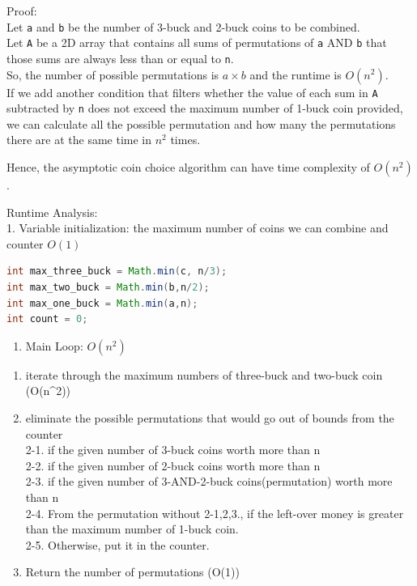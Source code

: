 \documentclass[
]{article}
\newcommand{\passthrough}[1]{#1}
\providecommand{\tightlist}{%
  \setlength{\itemsep}{0pt}\setlength{\parskip}{0pt}}
\begin{document}
Proof:\\
Let \passthrough{\lstinline!a!} and \passthrough{\lstinline!b!} be the
number of 3-buck and 2-buck coins to be combined.\\
Let \passthrough{\lstinline!A!} be a 2D array that contains all sums of
permutations of \passthrough{\lstinline!a!} AND
\passthrough{\lstinline!b!} that those sums are always less than or
equal to \passthrough{\lstinline!n!}.\\
So, the number of possible permutations is \(a \times b\) and the
runtime is \(O(n^2)\).\\
If we add another condition that filters whether the value of each sum
in \passthrough{\lstinline!A!} subtracted by \passthrough{\lstinline!n!}
does not exceed the maximum number of 1-buck coin provided, we can
calculate all the possible permutation and how many the permutations
there are at the same time in \(n^2\) times.

Hence, the asymptotic coin choice algorithm can have time complexity of
\(O(n^2)\).

Runtime Analysis:\\
1. Variable initialization: the maximum number of coins we can combine
and counter \(O(1)\)

\begin{lstlisting}[language=Java]
int max_three_buck = Math.min(c, n/3);
int max_two_buck = Math.min(b,n/2);
int max_one_buck = Math.min(a,n);
int count = 0;
\end{lstlisting}

\begin{enumerate}
\def\labelenumi{\arabic{enumi}.}
\setcounter{enumi}{1}
\tightlist
\item
  Main Loop: \(O(n^2)\)
\end{enumerate}

\begin{enumerate}
\def\labelenumi{\arabic{enumi})}
\tightlist
\item
  iterate through the maximum numbers of three-buck and two-buck coin
  (O(n\^{}2))
\item
  eliminate the possible permutations that would go out of bounds from
  the counter\\
  2-1. if the given number of 3-buck coins worth more than n\\
  2-2. if the given number of 2-buck coins worth more than n\\
  2-3. if the given number of 3-AND-2-buck coins(permutation) worth more
  than n\\
  2-4. From the permutation without 2-1,2,3., if the left-over money is
  greater than the maximum number of 1-buck coin.\\
  2-5. Otherwise, put it in the counter.
\item
  Return the number of permutations (O(1))
\end{enumerate}
\end{document}
